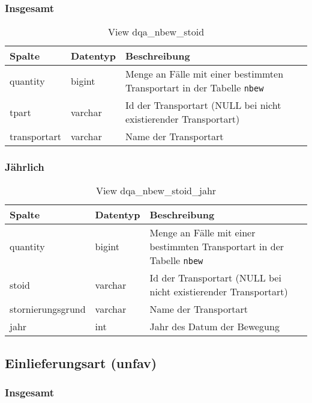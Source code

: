 \subsubsection{Insgesamt} \label{subsubsec:bewTpartI}

\begin{table}[ht]
	\centering   
	\caption{View dqa\_nbew\_stoid}
	\label{tab:bewTpartI}
	\begin{tabular}{||l|l|p{10cm}||}   		
		\hline
		Spalte & Datentyp & Beschreibung \\ [0.5ex]
		\hline\hline
		quantity & bigint & Menge an Fälle mit einer bestimmten Transportart in der Tabelle \texttt{nbew} \\
		\hline
		tpart & varchar & Id der Transportart (NULL bei nicht existierender Transportart)\\
		\hline
		transportart & varchar & Name der Transportart \\
		\hline
	\end{tabular}
\end{table}

\subsubsection{Jährlich} \label{subsubsec:bewTpartJ}

\begin{table}[ht]
	\centering   
	\caption{View dqa\_nbew\_stoid\_jahr}
	\label{tab:bewTpartJ}
	\begin{tabular}{||l|l|p{10cm}||}
		\hline
		Spalte & Datentyp & Beschreibung \\ [0.5ex]
		\hline\hline
		quantity & bigint & Menge an Fälle mit einer bestimmten Transportart in der Tabelle \texttt{nbew}\\
		\hline
		stoid & varchar & Id der Transportart (NULL bei nicht existierender Transportart)\\
		\hline
		stornierungsgrund & varchar & Name der Transportart \\
		\hline
		jahr & int &  Jahr des Datum der Bewegung \\
		\hline		
	\end{tabular}
\end{table}

\subsection{Einlieferungsart (unfav)} \label{subsec:bewUnfav}

\subsubsection{Insgesamt} \label{subsubsec:bewUnfavI}

